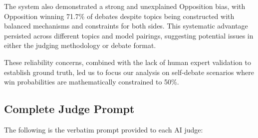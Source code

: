 \documentclass{article}
\begin{document}
The system also demonstrated a strong and unexplained Opposition bias, with Opposition winning 71.7\% of debates despite topics being constructed with balanced mechanisms and constraints for both sides. This systematic advantage persisted across different topics and model pairings, suggesting potential issues in either the judging methodology or debate format.

These reliability concerns, combined with the lack of human expert validation to establish ground truth, led us to focus our analysis on self-debate scenarios where win probabilities are mathematically constrained to 50\%.

\subsection{Complete Judge Prompt}

The following is the verbatim prompt provided to each AI judge:

\end{document}
